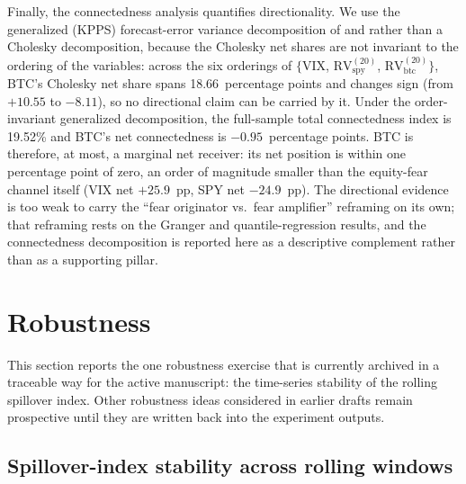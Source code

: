\documentclass[11pt,a4paper]{article}
\begin{document}
Finally, the connectedness analysis quantifies directionality. We use the generalized (KPPS) forecast-error variance decomposition of \citet{koop1996} and \citet{pesaran1998} rather than a Cholesky decomposition, because the Cholesky net shares are not invariant to the ordering of the variables: across the six orderings of $\{$VIX, $\text{RV}^{(20)}_{\text{spy}}$, $\text{RV}^{(20)}_{\text{btc}}\}$, BTC's Cholesky net share spans 18.66~percentage points and changes sign (from $+10.55$ to $-8.11$), so no directional claim can be carried by it. Under the order-invariant generalized decomposition, the full-sample total connectedness index is 19.52\% and BTC's net connectedness is $-0.95$~percentage points.%
 BTC is therefore, at most, a marginal net receiver: its net position is within one percentage point of zero, an order of magnitude smaller than the equity-fear channel itself (VIX net $+25.9$~pp, SPY net $-24.9$~pp). The directional evidence is too weak to carry the ``fear originator vs.\ fear amplifier'' reframing on its own; that reframing rests on the Granger and quantile-regression results, and the connectedness decomposition is reported here as a descriptive complement rather than as a supporting pillar.

\section{Robustness}
\label{sec:robustness}

This section reports the one robustness exercise that is currently archived in a traceable way for the active manuscript: the time-series stability of the rolling spillover index. Other robustness ideas considered in earlier drafts remain prospective until they are written back into the experiment outputs.

\subsection{Spillover-index stability across rolling windows}
\label{subsec:r_spillover}
\end{document}
